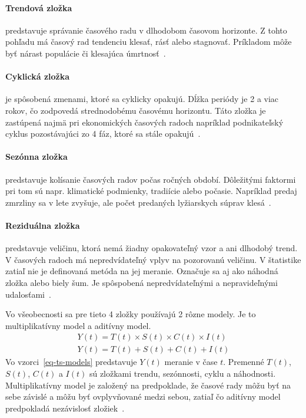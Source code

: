 \documentclass[a4paper,slovak,12pt,appendix]{article}
\begin{document}
\paragraph{Trendová zložka} predstavuje správanie časového radu v dlhodobom
časovom horizonte. Z tohto pohľadu má časový rad tendenciu klesať, rásť alebo
stagnovať. Príkladom môže byť nárast populácie či klesajúca
úmrtnosť~\cite{Agrawal2013}.

\paragraph{Cyklická zložka} je spôsobená zmenami, ktoré sa cyklicky opakujú.
Dĺžka periódy je 2 a viac rokov, čo zodpovedá strednodobému časovému horizontu.
Táto zložka je zastúpená najmä pri ekonomických časových radoch napríklad
podnikateľský cyklus pozostávajúci zo 4 fáz, ktoré sa stále
opakujú~\cite{Agrawal2013}.

\paragraph{Sezónna zložka} predstavuje kolísanie časových radov počas ročných
období. Dôležitými faktormi pri tom sú napr. klimatické podmienky, tradiície
 alebo počasie. Napríklad predaj zmrzliny sa v lete zvyšuje, ale počet
 predaných lyžiarskych súprav klesá~\cite{Agrawal2013}.

\paragraph{Reziduálna zložka} predstavuje veličinu, ktorá nemá žiadny
opakovateľný vzor a ani dlhodobý trend. V časových radoch má nepredvídateľný
vplyv na pozorovanú veličinu. V štatistike zatiaľ nie je definovaná metóda na
jej meranie. Označuje sa aj ako náhodná zložka alebo biely šum. Je spôspobená
nepredvídateľnými a nepravideľnými udalosťami~\cite{Agrawal2013}.

Vo všeobecnosti sa pre tieto 4 zložky používajú 2 rôzne modely. Je to
multiplikatívny model a aditívny model.
\begin{equation}
  \begin{split}
    Y(t) = T(t) \times S(t) \times C(t) \times I(t)
    \\
    Y(t) = T(t) + S(t) + C(t) + I(t)
  \end{split}
  \label{eq-ts-models}
\end{equation}
Vo vzorci~\ref{eq-ts-models} predstavuje $Y(t)$ meranie v čase $t$. Premenné
$T(t)$, $S(t)$, $C(t)$ a $I(t)$ sú zložkami trendu, sezónnosti,
cyklu a náhodnosti. Multiplikatívny model je založený na predpoklade, že časové
rady môžu byť na sebe závislé a môžu byť ovplyvňované medzi sebou, zatiaľ čo
aditívny model predpokladá nezávislosť zložiek~\cite{Agrawal2013}.
\end{document}
